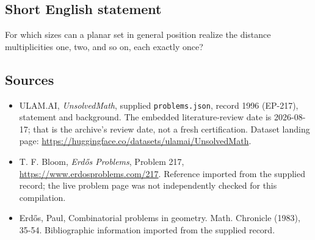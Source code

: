 \documentclass[11pt,a4paper]{article}
\begin{document}
\subsection{Short English statement}

For which sizes can a planar set in general position realize the distance multiplicities one, two, and so on, each exactly once?

\subsection{Sources}

{\small

\begin{itemize}

\item[\hypertarget{source:1996:1}{S1}] ULAM.AI, \emph{UnsolvedMath}, supplied \texttt{problems.json}, record 1996 (EP-217), statement and background. The embedded literature-review date is 2026-08-17; that is the archive’s review date, not a fresh certification. Dataset landing page: \url{https://huggingface.co/datasets/ulamai/UnsolvedMath}.

\item[\hypertarget{source:1996:2}{S2}] T. F. Bloom, \emph{Erdős Problems}, Problem 217, \url{https://www.erdosproblems.com/217}. Reference imported from the supplied record; the live problem page was not independently checked for this compilation.

\item[\hypertarget{source:1996:3}{S3}] Erd\H{o}s, Paul, Combinatorial problems in geometry. Math. Chronicle (1983), 35-54. Bibliographic information imported from the supplied record.

\end{itemize}

}

\label{end:1996}
\end{document}
